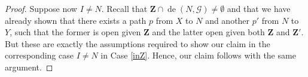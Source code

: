 \documentclass[11pt,a4paper]{article}
\theoremstyle{definition}
\theoremstyle{remark}
\DeclareMathOperator{\de}{de}
\DeclareMathOperator{\an}{an}
\newcommand{\g}[1][G]{\mathcal{#1}}
\begin{document}
\begin{proof}
	Suppose now $I \neq N$. Recall that $\mathbf{Z} \cap \de(N,\g) \neq \emptyset$ and that we have already shown that there exists a path $p$ from $X$ to $N$ and another $p'$ from $N$ to $Y$, such that the former is open given $\mathbf{Z}$ and the latter open given both $\mathbf{Z}$ and $\mathbf{Z'}$. But these are exactly the assumptions required to show our claim in the corresponding case $I \neq N$ in Case \ref{inZ}. Hence, our claim follows with the same argument.
	
%	

	
	
	
	
\end{proof}
\end{document}
